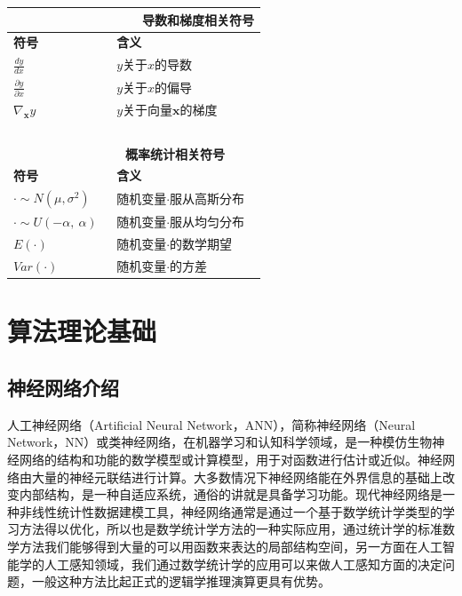 \documentclass[UTF-8]{progbookcn}
\begin{document}
\begin{table}[!ht]
\begin{tabular}{l|l}
\multicolumn{2}{l}{~~~~~~~~~~~~~~~~~~\textbf{导数和梯度相关符号}}\\ \hline
\textbf{符号}\hspace{12em} & \textbf{含义}          \\  \hline
$\frac{dy}{dx}$                                & $y$关于$x$的导数 \\
$\frac{\partial y}{\partial x}$                         &  $y$关于$x$的偏导 \\
$\nabla_{\bm{x}} y$                         & $y$关于向量$\bm{x}$的梯度 \\
\hline\multicolumn{2}{l}{~~~~~~~~~~~~~~~~~~}\\
\multicolumn{2}{l}{~~~~~~~~~~~~~~~~~~\textbf{概率统计相关符号}}\\ \hline
\textbf{符号}\hspace{12em} & \textbf{含义}          \\  \hline
$\cdot \sim N(\mu, \sigma^2)$                         & 随机变量$\cdot$服从高斯分布   \\
$\cdot \sim U(-\alpha,~ \alpha)$                       & 随机变量$\cdot$服从均匀分布   \\
$E(\cdot)$                                & 随机变量$\cdot$的数学期望 \\
$Var(\cdot)$                                & 随机变量$\cdot$的方差 \\ \hline
\end{tabular}%
\end{table}





\clearpage
{
  \hypersetup{hidelinks}
  \tableofcontents
}


\mainmatter


\part{算法理论基础}
\chapter{神经网络介绍}

人工神经网络（Artificial Neural Network，ANN），简称神经网络（Neural Network，NN）或类神经网络，在机器学习和认知科学领域，是一种模仿生物神经网络的结构和功能的数学模型或计算模型，用于对函数进行估计或近似\cite{DBLP:journals/robotica/Andrew99j}。神经网络由大量的神经元联结进行计算。大多数情况下神经网络能在外界信息的基础上改变内部结构，是一种自适应系统，通俗的讲就是具备学习功能\cite{DBLP:journals/nn/SchiffmannG93}。现代神经网络是一种非线性统计性数据建模工具，神经网络通常是通过一个基于数学统计学类型的学习方法得以优化，所以也是数学统计学方法的一种实际应用，通过统计学的标准数学方法我们能够得到大量的可以用函数来表达的局部结构空间，另一方面在人工智能学的人工感知领域，我们通过数学统计学的应用可以来做人工感知方面的决定问题，一般这种方法比起正式的逻辑学推理演算更具有优势\cite{DBLP:journals/ijon/PrietoPORPOR16}。
\end{document}
